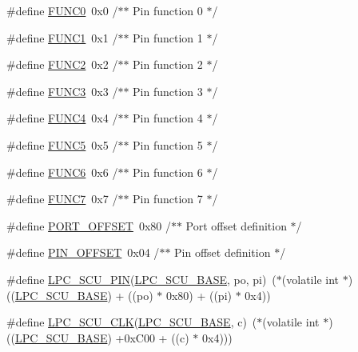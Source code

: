 \begin{DoxyCompactItemize}
\item 
\#define \hyperlink{group___s_c_u__18_x_x__43_x_x_gaa3ba064ba85ae0da9c55e7cdb8ea09b3}{F\+U\+N\+C0}~0x0				/$\ast$$\ast$ Pin function 0 $\ast$/
\item 
\#define \hyperlink{group___s_c_u__18_x_x__43_x_x_ga3f9b8eb1b4789fef1da73f4eb041ddfc}{F\+U\+N\+C1}~0x1				/$\ast$$\ast$ Pin function 1 $\ast$/
\item 
\#define \hyperlink{group___s_c_u__18_x_x__43_x_x_ga0e8023a25dd46655b8eda5b0476ba169}{F\+U\+N\+C2}~0x2				/$\ast$$\ast$ Pin function 2 $\ast$/
\item 
\#define \hyperlink{group___s_c_u__18_x_x__43_x_x_gadeea02cdf0e8b64c27b6fad4d2b3b2b5}{F\+U\+N\+C3}~0x3				/$\ast$$\ast$ Pin function 3 $\ast$/
\item 
\#define \hyperlink{group___s_c_u__18_x_x__43_x_x_ga769e96bef0ce818be7aa2cb0a0a67753}{F\+U\+N\+C4}~0x4				/$\ast$$\ast$ Pin function 4 $\ast$/
\item 
\#define \hyperlink{group___s_c_u__18_x_x__43_x_x_gaa8d0feff604f4d347ce09d433de1b32d}{F\+U\+N\+C5}~0x5				/$\ast$$\ast$ Pin function 5 $\ast$/
\item 
\#define \hyperlink{group___s_c_u__18_x_x__43_x_x_ga3070395c343da6e051c4ebbcd3185a87}{F\+U\+N\+C6}~0x6				/$\ast$$\ast$ Pin function 6 $\ast$/
\item 
\#define \hyperlink{group___s_c_u__18_x_x__43_x_x_ga25318daff6c777173bc54d6eeac7cb83}{F\+U\+N\+C7}~0x7				/$\ast$$\ast$ Pin function 7 $\ast$/
\item 
\#define \hyperlink{group___s_c_u__18_x_x__43_x_x_ga54a4b9ad44bb7c8198f74fad5fdc4ceb}{P\+O\+R\+T\+\_\+\+O\+F\+F\+S\+ET}~0x80			/$\ast$$\ast$ Port offset definition $\ast$/
\item 
\#define \hyperlink{group___s_c_u__18_x_x__43_x_x_ga5f7411607a507d91047cc61c4bd5d815}{P\+I\+N\+\_\+\+O\+F\+F\+S\+ET}~0x04			/$\ast$$\ast$ Pin offset definition $\ast$/
\item 
\#define \hyperlink{group___s_c_u__18_x_x__43_x_x_ga339447eec03e1342c675fd3944347e50}{L\+P\+C\+\_\+\+S\+C\+U\+\_\+\+P\+IN}(\hyperlink{group___p_e_r_i_p_h__43_x_x___b_a_s_e_gacd777eafbfcbc5701c9728c9261b1bd1}{L\+P\+C\+\_\+\+S\+C\+U\+\_\+\+B\+A\+SE},  po,  pi)~($\ast$(volatile int $\ast$) ((\hyperlink{group___p_e_r_i_p_h__43_x_x___b_a_s_e_gacd777eafbfcbc5701c9728c9261b1bd1}{L\+P\+C\+\_\+\+S\+C\+U\+\_\+\+B\+A\+SE}) + ((po) $\ast$ 0x80) + ((pi) $\ast$ 0x4))
\item 
\#define \hyperlink{group___s_c_u__18_x_x__43_x_x_ga2de55e3e5c3031afc6e123f4c0de21c2}{L\+P\+C\+\_\+\+S\+C\+U\+\_\+\+C\+LK}(\hyperlink{group___p_e_r_i_p_h__43_x_x___b_a_s_e_gacd777eafbfcbc5701c9728c9261b1bd1}{L\+P\+C\+\_\+\+S\+C\+U\+\_\+\+B\+A\+SE},  c)~($\ast$(volatile int $\ast$) ((\hyperlink{group___p_e_r_i_p_h__43_x_x___b_a_s_e_gacd777eafbfcbc5701c9728c9261b1bd1}{L\+P\+C\+\_\+\+S\+C\+U\+\_\+\+B\+A\+SE}) +0x\+C00 + ((c) $\ast$ 0x4)))
\end{DoxyCompactItemize}
